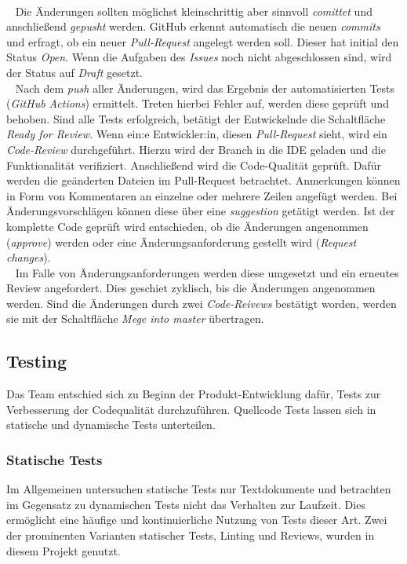 \documentclass[10pt, a4paper]{article}
\begin{document}
\begin{onehalfspace}
    \\~
    Die Änderungen sollten möglichst kleinschrittig aber sinnvoll \textit{comittet} und anschließend \textit{gepusht} werden.
    GitHub erkennt automatisch die neuen \textit{commits} und erfragt, ob ein neuer \textit{Pull-Request} angelegt werden soll.
    Dieser hat initial den Status \textit{Open}.
    Wenn die Aufgaben des \textit{Issues} noch nicht abgeschlossen sind, wird der Status auf \textit{Draft} gesetzt.
    \\~
    Nach dem \textit{push} aller Änderungen, wird das Ergebnis der automatisierten Tests (\textit{GitHub Actions}) ermittelt. Treten hierbei Fehler auf,
    werden diese geprüft und behoben. Sind alle Tests erfolgreich, betätigt der Entwickelnde die Schaltfläche \textit{Ready for Review}.
    Wenn ein:e Entwickler:in, diesen \textit{Pull-Request} sieht, wird ein \textit{Code-Review} durchgeführt.
    Hierzu wird der Branch in die IDE geladen und die Funktionalität verifiziert. Anschließend wird die Code-Qualität geprüft.
    Dafür werden die geänderten Dateien im Pull-Request betrachtet. Anmerkungen können in Form
    von Kommentaren an einzelne oder mehrere Zeilen angefügt werden. Bei Änderungsvorschlägen können diese über eine \textit{suggestion}
    getätigt werden. Ist der komplette Code geprüft wird entschieden,
    ob die Änderungen angenommen (\textit{approve}) werden oder eine Änderungsanforderung gestellt wird (\textit{Request changes}).
    \\~
    Im Falle von Änderungsanforderungen werden diese umgesetzt und ein erneutes Review angefordert. Dies geschiet zyklisch, bis die Änderungen angenommen werden.
    Sind die Änderungen durch zwei \textit{Code-Reivews} bestätigt worden, werden sie mit der Schaltfläche \textit{Mege into master} übertragen.

  \subsection{Testing}
  Das Team entschied sich zu Beginn der Produkt-Entwicklung dafür, Tests zur Verbesserung der Codequalität durchzuführen.
  Quellcode Tests lassen sich in statische und dynamische Tests unterteilen.

  \subsubsection*{Statische Tests}
    Im Allgemeinen untersuchen statische Tests nur Textdokumente und betrachten im Gegensatz zu dynamischen Tests nicht das Verhalten zur Laufzeit.
    Dies ermöglicht eine häufige und kontinuierliche Nutzung von Tests dieser Art.
    Zwei der prominenten Varianten statischer Tests, Linting und Reviews, wurden in diesem Projekt genutzt.


\end{onehalfspace}
\end{document}
